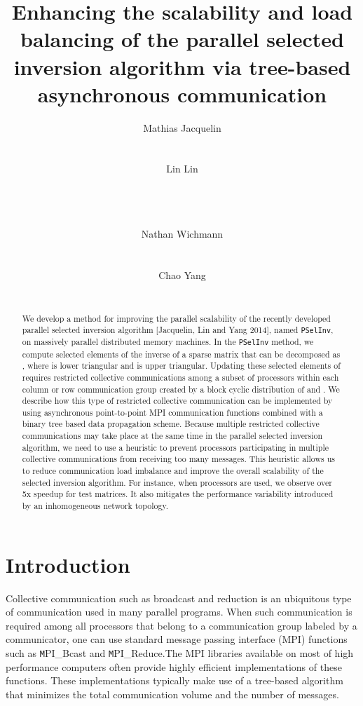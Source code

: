 \documentclass{acm_proc_article-sp}
\title{Enhancing the scalability and load balancing of the parallel
selected inversion algorithm via tree-based asynchronous communication}
\author{
\alignauthor
Mathias Jacquelin\\
   \affaddr{Lawrence Berkeley National Laboratory}\\
   \email{mjacquelin@lbl.gov}\\
\alignauthor
Lin Lin\\
   \affaddr{University of California Berkeley}\\
   \affaddr{Lawrence Berkeley National Laboratory}\\
   \email{linlin@math.berkeley.edu}\\
\and
\alignauthor
Nathan Wichmann\\
    \affaddr{Cray Inc.}\\
   \email{wichmann@cray.com}\\
\alignauthor
Chao Yang\\
    \affaddr{Lawrence Berkeley National Laboratory}
   \email{cyang@lbl.gov}\\
}
\begin{document}
\maketitle


\nocite{LinLuYingE2009,LinLuYingCarE2009,LinYangLuEtAl2011,LinYangMezaEtAl2011}


\begin{abstract}






We develop a method for improving the parallel scalability of the
recently developed parallel selected inversion algorithm [Jacquelin, Lin
and Yang 2014], named \texttt{PSelInv}, on massively parallel
distributed memory machines.  In the \texttt{PSelInv} method, we compute
selected elements of the inverse of a sparse matrix  that can be
decomposed as , where  is lower triangular and  is upper
triangular. Updating these selected elements of  requires
restricted collective communications among a subset of processors within
each column or row communication group created by a block cyclic
distribution of  and .  We describe how this type of restricted
collective communication can be implemented by using asynchronous
point-to-point MPI communication functions combined with a binary tree
based data propagation scheme. Because multiple restricted collective
communications may take place at the same time in the parallel selected
inversion algorithm, we need to use a heuristic to prevent processors
participating in multiple collective communications from receiving too
many messages.  This heuristic allows us to reduce communication load
imbalance and improve the overall scalability of the selected inversion
algorithm.  For instance, when  processors are used, we observe
over 5x speedup for test matrices. It also mitigates the performance
variability introduced by an inhomogeneous network topology.




\end{abstract}




\section{Introduction}\label{sec:intro}

Collective communication such as broadcast and reduction 
is an ubiquitous type of communication used in many 
parallel programs.  When such communication is required 
among all processors that belong to a communication group
labeled by a communicator, one can use standard message
passing interface (MPI) functions such as 
{\texttt MPI\_Bcast} and {\texttt MPI\_Reduce}.The MPI libraries available on most of high performance
computers often provide highly efficient implementations of
these functions. These implementations typically make use of
a tree-based algorithm that minimizes the total communication
volume and the number of messages.
\end{document}
